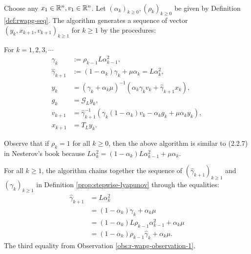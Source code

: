 \documentclass[12pt]{article}
\begin{document}
    \begin{definition}\label{def:wapg}\;\\
        Choose any $x_1 \in \mathbb R^n, v_1 \in \mathbb R^n$. 
        Let $(\alpha_k)_{k \ge0}, (\rho_k)_{k \ge 0}$ be given by Definition \ref{def:rwapg-seq}. 
        The algorithm generates a sequence of vector $(y_k, x_{k + 1}, v_{k + 1})_{k \ge 1}$ for $k\ge 1$ by the procedures:  
        \begin{tcolorbox}
            For $k=1, 2, 3, \cdots$
            \begin{align*}
                \gamma_k &:= \rho_{k -1}L\alpha_{k - 1}^2, 
                \\
                \hat \gamma_{k + 1} & := (1 - \alpha_k)\gamma_k + \mu \alpha_k = L\alpha_k^2, 
                \\
                y_k &= 
                (\gamma_k + \alpha_k \mu)^{-1}(\alpha_k \gamma_k v_k + \hat\gamma_{k + 1} x_k), 
                \\
                g_k &= \mathcal G_L y_k, 
                \\
                v_{k + 1} &= 
                \hat\gamma^{-1}_{k + 1}
                (\gamma_k(1 - \alpha_k) v_k - \alpha_k g_k + \mu \alpha_k y_k), 
                \\
                x_{k + 1} &= T_L y_k. 
            \end{align*}    
        \end{tcolorbox}
    \end{definition}
    \begin{observation}\label{obs:r-wapg-observation-2}
        Observe that if $\rho_k = 1$ for all $k\ge 0$, then the above algorithm is similar to (2.2.7) in Nesterov's book \cite{nesterov_lectures_2018} because $L\alpha_k^{2} = (1 - \alpha_k)L\alpha_{k - 1}^2 + \mu \alpha_k$. 
        \par
        For all $k \ge 1$, the algorithm chains together the sequence of $(\hat \gamma_{k+1})_{k \ge 1}$ and $(\gamma_k)_{k \ge 1}$ in Definition \ref{prop:stepwise-lyapunov} through the equalities: 
        \begin{align*}
            \hat \gamma_{k + 1} 
            &= L\alpha_k^2 
            \\
            &= (1 - \alpha_k)\gamma_k + \alpha_k \mu
            \\
            &= (1 - \alpha_k)L\rho_{k - 1}\alpha_{k - 1}^2 + \alpha_k \mu
            \\
            &= (1 - \alpha_k)\rho_{k - 1}\hat \gamma_{k} + \alpha_k \mu. 
        \end{align*}
        The third equality from Observation \ref{obs:r-wapg-observation-1}. 
    \end{observation}
    
\end{document}
